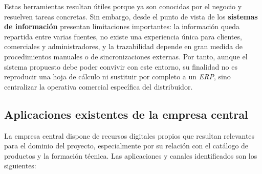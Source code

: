 Estas herramientas resultan útiles porque ya son conocidas por el negocio y resuelven tareas concretas. Sin embargo, desde el punto de vista de los \textbf{sistemas de información} presentan limitaciones importantes: la información queda repartida entre varias fuentes, no existe una experiencia única para clientes, comerciales y administradores, y la trazabilidad depende en gran medida de procedimientos manuales o de sincronizaciones externas. Por tanto, aunque el sistema propuesto debe poder convivir con este entorno, su finalidad no es reproducir una hoja de cálculo ni sustituir por completo a un \textit{ERP}, sino centralizar la operativa comercial específica del distribuidor.

\subsection{Aplicaciones existentes de la empresa central}

La empresa central dispone de recursos digitales propios que resultan relevantes para el dominio del proyecto, especialmente por su relación con el catálogo de productos y la formación técnica. Las aplicaciones y canales identificados son los siguientes:

